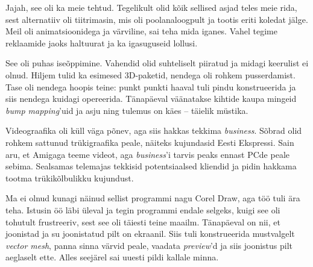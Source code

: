 
Jajah, see oli ka meie tehtud. Tegelikult olid kõik sellised asjad teles meie 
rida, sest alternatiiv oli tiitrimasin, mis oli poolanaloogpult 
ja tootis eriti koledat jälge. Meil oli 
animatsioonidega ja värviline, sai teha mida iganes. Vahel tegime reklaamide jaoks
haltuurat ja ka igasuguseid lollusi.


See oli puhas iseõppimine. Vahendid olid suhteliselt 
piiratud ja midagi keerulist ei olnud. Hiljem tulid ka 
esimesed 3D-paketid, nendega oli rohkem pusserdamist. Tase oli nendega hoopis 
teine: punkt punkti haaval tuli pindu konstrueerida ja 
siis nendega kuidagi opereerida. Tänapäeval väänatakse kihtide kaupa mingeid 
\emph{bump mapping}'uid ja 
asju ning tulemus on käes -- täielik müstika. 


Videograafika oli küll väga põnev, aga siis hakkas tekkima 
\emph{business}. Sõbrad olid rohkem sattunud 
trükigraafika peale, näiteks kujundasid Eesti Ekspressi. Sain aru, et Amigaga teeme 
videot, aga \emph{business}'i tarvis peaks ennast 
PCde peale sebima. Sealsamas telemajas tekkisid 
potentsiaalsed kliendid ja pidin hakkama tootma trükikõlbulikku kujundust. 

Ma ei olnud kunagi näinud sellist programmi nagu Corel Draw, 
aga töö tuli ära teha. Istusin öö läbi üleval ja tegin programmi endale 
selgeks, kuigi see oli tohutult frustreeriv, sest see oli täiesti teine maailm. 
Tänapäeval on nii, et joonistad ja su joonistatud pilt on ekraanil. Siis 
tuli konstrueerida mustvalgelt \emph{vector 
mesh}, panna sinna värvid peale, vaadata \emph{preview}'d ja siis 
joonistus pilt aeglaselt ette. Alles seejärel sai uuesti 
pildi kallale minna.


